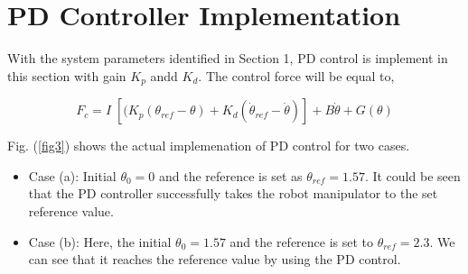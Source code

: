 \documentclass[12pt]{article}
\begin{document}
\section{PD Controller Implementation}
With the system parameters identified in Section 1, PD control is implement in this section with gain $K_p$ andd $K_d$. The control force will be equal to, 

\begin{equation}
	F_c = I \; [(K_p (\theta_{ref} - \theta) + K_d (\dot{\theta}_{ref} - \dot{\theta})] + B\dot{\theta} + G(\theta)
\end{equation}

 Fig. (\ref{fig3}) shows the actual implemenation of PD control for two cases. 
\begin{itemize}
	\item Case (a): Initial $\theta_{0} = 0$ and the reference is set as $\theta_{ref} = 1.57$. It could be seen that the PD controller successfully takes the robot manipulator to the set reference value.
	\item Case (b): Here, the initial $\theta_{0} = 1.57$ and the reference is set to $\theta_{ref} = 2.3$. We can see that it reaches the reference value by using the PD control. 
\end{itemize}
\end{document}
